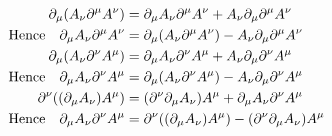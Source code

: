 \documentclass[letterpaper]{article}
\theoremstyle{definition}
\begin{document}
\begin{align*}
  \partial_\mu (A_\nu \partial^\mu A^\nu)          & =\partial_\mu A_\nu \partial^\mu A^\nu + A_\nu \partial_\mu\partial^\mu A^\nu         \\
  \qq*{Hence}\partial_\mu A_\nu \partial^\mu A^\nu & = \partial_\mu (A_\nu \partial^\mu A^\nu) - A_\nu \partial_\mu\partial^\mu A^\nu      \\
  \partial_\mu (A_\nu \partial^\nu A^\mu)          & =\partial_\mu A_\nu \partial^\nu A^\mu + A_\nu \partial_\mu\partial^\nu A^\mu         \\
  \qq*{Hence}\partial_\mu A_\nu \partial^\nu A^\mu & =\partial_\mu (A_\nu \partial^\nu A^\mu) - A_\nu \partial_\mu\partial^\nu A^\mu       \\
  \partial^\nu ((\partial_\mu A_\nu)  A^\mu)       & =(\partial^\nu\partial_\mu A_\nu ) A^\mu + \partial_\mu A_\nu \partial^\nu A^\mu      \\
  \qq*{Hence}\partial_\mu A_\nu \partial^\nu A^\mu & =\partial^\nu ((\partial_\mu A_\nu)  A^\mu) - (\partial^\nu\partial_\mu A_\nu ) A^\mu \\
\end{align*}
\end{document}
